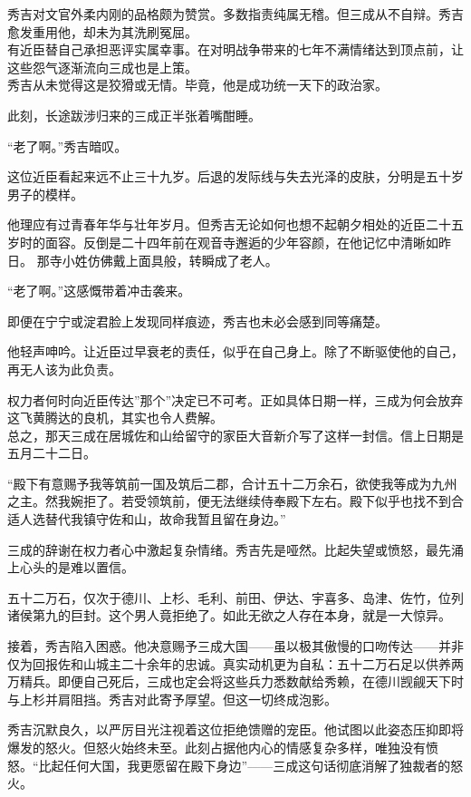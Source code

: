 \documentclass[
]{book}
\begin{document}
秀吉对文官外柔内刚的品格颇为赞赏。多数指责纯属无稽。但三成从不自辩。秀吉愈发重用他，却未为其洗刷冤屈。\\
有近臣替自己承担恶评实属幸事。在对明战争带来的七年不满情绪达到顶点前，让这些怨气逐渐流向三成也是上策。\\
秀吉从未觉得这是狡猾或无情。毕竟，他是成功统一天下的政治家。

此刻，长途跋涉归来的三成正半张着嘴酣睡。

``老了啊。''秀吉暗叹。

这位近臣看起来远不止三十九岁。后退的发际线与失去光泽的皮肤，分明是五十岁男子的模样。

他理应有过青春年华与壮年岁月。但秀吉无论如何也想不起朝夕相处的近臣二十五岁时的面容。反倒是二十四年前在观音寺邂逅的少年容颜，在他记忆中清晰如昨日。
那寺小姓仿佛戴上面具般，转瞬成了老人。

``老了啊。''这感慨带着冲击袭来。

即便在宁宁或淀君脸上发现同样痕迹，秀吉也未必会感到同等痛楚。

他轻声呻吟。让近臣过早衰老的责任，似乎在自己身上。除了不断驱使他的自己，再无人该为此负责。

权力者何时向近臣传达''那个''决定已不可考。正如具体日期一样，三成为何会放弃这飞黄腾达的良机，其实也令人费解。\\
总之，那天三成在居城佐和山给留守的家臣大音新介写了这样一封信。信上日期是五月二十二日。

``殿下有意赐予我等筑前一国及筑后二郡，合计五十二万余石，欲使我等成为九州之主。然我婉拒了。若受领筑前，便无法继续侍奉殿下左右。殿下似乎也找不到合适人选替代我镇守佐和山，故命我暂且留在身边。''

三成的辞谢在权力者心中激起复杂情绪。秀吉先是哑然。比起失望或愤怒，最先涌上心头的是难以置信。

五十二万石，仅次于德川、上杉、毛利、前田、伊达、宇喜多、岛津、佐竹，位列诸侯第九的巨封。这个男人竟拒绝了。如此无欲之人存在本身，就是一大惊异。

接着，秀吉陷入困惑。他决意赐予三成大国------虽以极其傲慢的口吻传达------并非仅为回报佐和山城主二十余年的忠诚。真实动机更为自私：五十二万石足以供养两万精兵。即便自己死后，三成也定会将这些兵力悉数献给秀赖，在德川觊觎天下时与上杉并肩阻挡。秀吉对此寄予厚望。但这一切终成泡影。

秀吉沉默良久，以严厉目光注视着这位拒绝馈赠的宠臣。他试图以此姿态压抑即将爆发的怒火。但怒火始终未至。此刻占据他内心的情感复杂多样，唯独没有愤怒。``比起任何大国，我更愿留在殿下身边''------三成这句话彻底消解了独裁者的怒火。
\end{document}
